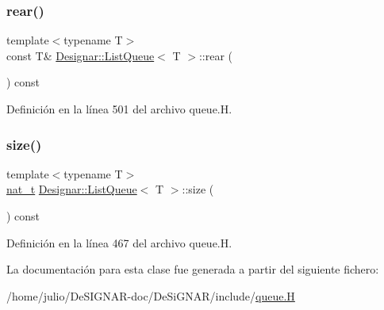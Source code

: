 \subsubsection{\texorpdfstring{rear()}{rear()}\hspace{0.1cm}{\footnotesize\ttfamily [2/2]}}
{\footnotesize\ttfamily template$<$typename T$>$ \\
const T\& \hyperlink{class_designar_1_1_list_queue}{Designar\+::\+List\+Queue}$<$ T $>$\+::rear (\begin{DoxyParamCaption}{ }\end{DoxyParamCaption}) const\hspace{0.3cm}{\ttfamily [inline]}}



Definición en la línea 501 del archivo queue.\+H.

\mbox{\label{class_designar_1_1_list_queue_a0a2d3a25c27b0529b1bcc4b0c0b27855}} 
\subsubsection{\texorpdfstring{size()}{size()}}
{\footnotesize\ttfamily template$<$typename T$>$ \\
\hyperlink{namespace_designar_aa72662848b9f4815e7bf31a7cf3e33d1}{nat\+\_\+t} \hyperlink{class_designar_1_1_list_queue}{Designar\+::\+List\+Queue}$<$ T $>$\+::size (\begin{DoxyParamCaption}{ }\end{DoxyParamCaption}) const\hspace{0.3cm}{\ttfamily [inline]}}



Definición en la línea 467 del archivo queue.\+H.



La documentación para esta clase fue generada a partir del siguiente fichero\+:\begin{DoxyCompactItemize}
\item 
/home/julio/\+De\+S\+I\+G\+N\+A\+R-\/doc/\+De\+Si\+G\+N\+A\+R/include/\hyperlink{queue_8_h}{queue.\+H}\end{DoxyCompactItemize}
